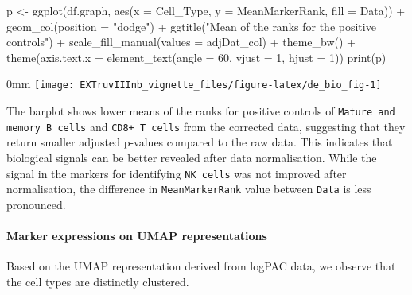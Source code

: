\documentclass[]{article}
\newcommand{\hlnum}[1]{\textcolor[rgb]{0.816,0.125,0.439}{#1}}%
\newcommand{\hlstr}[1]{\textcolor[rgb]{0.251,0.627,0.251}{#1}}%
\newcommand{\hlstd}[1]{\textcolor[rgb]{0.251,0.251,0.251}{#1}}%
\newenvironment{Shaded}{\begin{myshaded}}{\end{myshaded}}
\newcommand{\DecValTok}[1]{\hlnum{#1}}
\newcommand{\SpecialCharTok}[1]{\hlstr{#1}}
\newcommand{\StringTok}[1]{\hlstr{#1}}
\newcommand{\OtherTok}[1]{{#1}}
\newcommand{\FunctionTok}[1]{\hlstd{#1}}
\newcommand{\AttributeTok}[1]{{#1}}
\newcommand{\NormalTok}[1]{\hlstd{#1}}
\begin{document}
\begin{Shaded}
\begin{Highlighting}[]
\NormalTok{p }\OtherTok{\textless{}{-}} \FunctionTok{ggplot}\NormalTok{(df.graph, }\FunctionTok{aes}\NormalTok{(}\AttributeTok{x =}\NormalTok{ Cell\_Type, }\AttributeTok{y =}\NormalTok{ MeanMarkerRank,}
    \AttributeTok{fill =}\NormalTok{ Data)) }\SpecialCharTok{+} \FunctionTok{geom\_col}\NormalTok{(}\AttributeTok{position =} \StringTok{"dodge"}\NormalTok{) }\SpecialCharTok{+} \FunctionTok{ggtitle}\NormalTok{(}\StringTok{"Mean of the ranks for the positive controls"}\NormalTok{) }\SpecialCharTok{+}
    \FunctionTok{scale\_fill\_manual}\NormalTok{(}\AttributeTok{values =}\NormalTok{ adjDat\_col) }\SpecialCharTok{+} \FunctionTok{theme\_bw}\NormalTok{() }\SpecialCharTok{+} \FunctionTok{theme}\NormalTok{(}\AttributeTok{axis.text.x =} \FunctionTok{element\_text}\NormalTok{(}\AttributeTok{angle =} \DecValTok{60}\NormalTok{,}
    \AttributeTok{vjust =} \DecValTok{1}\NormalTok{, }\AttributeTok{hjust =} \DecValTok{1}\NormalTok{))}
\FunctionTok{print}\NormalTok{(p)}
\end{Highlighting}
\end{Shaded}

\begin{adjustwidth}{\fltoffset}{0mm}
\texttt{[image: EXTruvIIInb\_vignette\_files/figure-latex/de\_bio\_fig-1]} \end{adjustwidth}

The barplot shows lower means of the ranks for positive controls of \texttt{Mature and memory B cells} and \texttt{CD8+ T cells} from the corrected data, suggesting that they return smaller adjusted p-values compared to the raw data. This indicates that biological signals can be better revealed after data normalisation. While the signal in the markers for identifying \texttt{NK cells} was not improved after normalisation, the difference in \texttt{MeanMarkerRank} value between \texttt{Data} is less pronounced.

\paragraph{Marker expressions on UMAP representations}\label{marker-expressions-on-umap-representations}

Based on the UMAP representation derived from logPAC data, we observe that the cell types are distinctly clustered.
\end{document}
